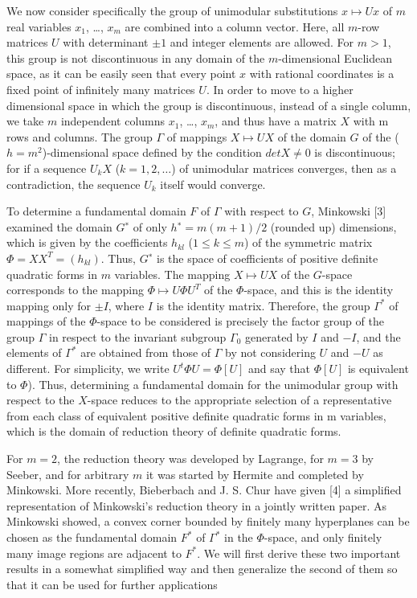 \documentclass[10pt]{amsart}
\begin{document}
We now consider specifically the group of unimodular substitutions $x \mapsto Ux$ of $m$
real variables $x_1$, \dots, $x_m$ are combined into a column vector. Here, all $m$-row
matrices $U$ with determinant $\pm 1$ and integer elements are allowed. For $m > 1$, this
group is not discontinuous in any domain of the $m$-dimensional Euclidean space, as
it can be easily seen that every point $x$ with rational coordinates is a fixed point
of infinitely many matrices $U$. In order to move to a higher dimensional space in
which the group is discontinuous, instead of a single column, we take $m$ independent
columns $x_1$, \dots, $x_m$, and thus have a matrix $X$ with m rows and columns. The group
$\Gamma$ of mappings $X \mapsto UX$ of the domain $G$ of the ($h = m^2$)-dimensional
space defined by the condition $det X\not= 0$ is discontinuous; for if a sequence $U_k X$ ($k = 1, 2, \dots$)
of unimodular matrices converges, then as a contradiction, the sequence $U_k$ itself
would converge.

To determine a fundamental domain $F$ of $\Gamma$ with respect to $G$, Minkowski [3]
examined the domain $G^∗$ of only $h^∗ = m(m + 1)/2$ (rounded up) dimensions,
which is given by the coefficients $h_{kl}$ ($1 \leq k \leq m$) of the symmetric matrix
$\Phi = X X^T = (h_{kl})$. Thus, $G^∗$ is the space of coefficients of positive
definite quadratic forms in $m$ variables. The mapping $X \mapsto UX$ of the $G$-space
corresponds to the mapping $\Phi \mapsto U \Phi U^T$ of the $\Phi$-space, and this
is the identity mapping only for $\pm I$, where $I$ is the identity matrix.
Therefore, the group $\Gamma^*$ of mappings of the $\Phi$-space to be considered
is precisely the factor group of the group $\Gamma$ in respect to the invariant
subgroup $\Gamma_0$ generated by $I$ and $−I$, and the elements of $\Gamma^*$ are
obtained from those of $\Gamma$ by not considering $U$ and $−U$ as different.
For simplicity, we write $U^t \Phi U = \Phi[U]$ and say that $\Phi[U]$ is equivalent to $\Phi$).
Thus, determining a fundamental domain for the unimodular group with respect to the $X$-space reduces
to the appropriate selection of a representative from each class of equivalent positive
definite quadratic forms in m variables, which is the domain of reduction theory of
definite quadratic forms.

For $m = 2$, the reduction theory was developed by Lagrange, for $m = 3$ by Seeber, and for
arbitrary $m$ it was started by Hermite and completed by Minkowski.
More recently, Bieberbach and J. S. Chur have given [4] a simplified representation
of Minkowski’s reduction theory in a jointly written paper. As Minkowski showed,
a convex corner bounded by finitely many hyperplanes can be chosen as the fundamental domain $F^*$ of $\Gamma^*$
in the $\Phi$-space, and only finitely many image regions are adjacent to $F^*$.
We will first derive these two important results in a somewhat
simplified way and then generalize the second of them so that it can be used for
further applications
\end{document}
